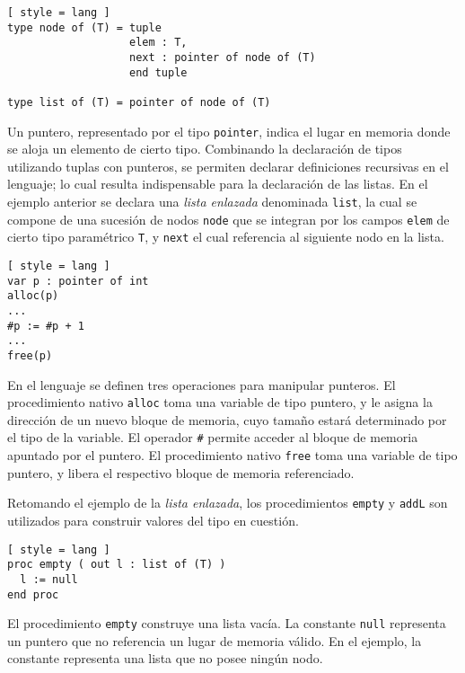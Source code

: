 \begin{lstlisting}[ style = lang ]
type node of (T) = tuple
                   elem : T,
                   next : pointer of node of (T)
                   end tuple

type list of (T) = pointer of node of (T)
\end{lstlisting}

Un puntero, representado por el tipo \lstinline[style = lang]{pointer}, indica el lugar en memoria donde se aloja un elemento de cierto tipo.
Combinando la declaración de tipos utilizando tuplas con punteros, se permiten declarar definiciones recursivas en el lenguaje; lo cual resulta indispensable para la declaración de las listas.
En el ejemplo anterior se declara una \textit{lista enlazada} denominada \lstinline[style = lang]{list}, la cual se compone de una sucesión de nodos \lstinline[style = lang]{node} que se integran por los campos \lstinline[style = lang]{elem} de cierto tipo paramétrico \lstinline[style = lang]{T}, y \lstinline[style = lang]{next} el cual referencia al siguiente nodo en la lista.

\begin{lstlisting}[ style = lang ]
var p : pointer of int
alloc(p)
...
#p := #p + 1
...
free(p)
\end{lstlisting}

En el lenguaje se definen tres operaciones para manipular punteros.
El procedimiento nativo \lstinline[style = lang]{alloc} toma una variable de tipo puntero, y le asigna la dirección de un nuevo bloque de memoria, cuyo tamaño estará determinado por el tipo de la variable.
El operador \lstinline[style = lang]{#} permite acceder al bloque de memoria apuntado por el puntero.
El procedimiento nativo \lstinline[style = lang]{free} toma una variable de tipo puntero, y libera el respectivo bloque de memoria referenciado.

Retomando el ejemplo de la \textit{lista enlazada}, los procedimientos \lstinline[style = lang]{empty} y \lstinline[style = lang]{addL} son utilizados para construir valores del tipo en cuestión.

\begin{lstlisting}[ style = lang ]
proc empty ( out l : list of (T) )
  l := null
end proc
\end{lstlisting}

El procedimiento \lstinline[style = lang]{empty} construye una lista vacía.
La constante \lstinline[style = lang]{null} representa un puntero que no referencia un lugar de memoria válido.
En el ejemplo, la constante representa una lista que no posee ningún nodo.

